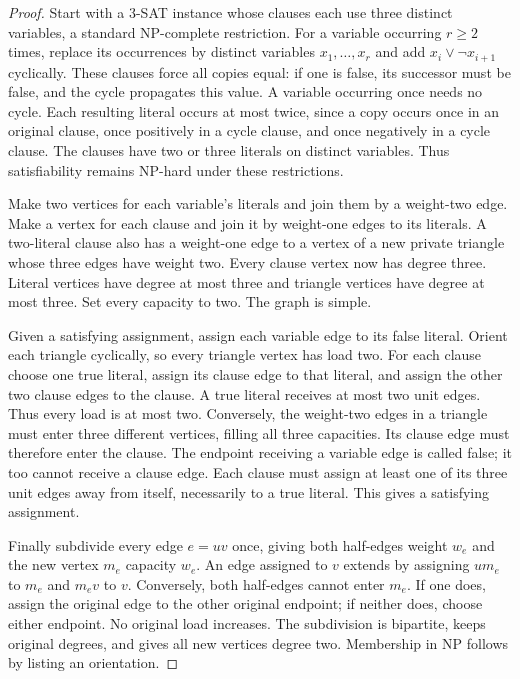 \begin{proof}
Start with a 3-SAT instance whose clauses each use three distinct
variables, a standard NP-complete restriction. For a variable occurring $r\ge2$ times,
replace its occurrences by distinct variables $x_1,\ldots,x_r$ and add
$x_i\vee\neg x_{i+1}$ cyclically. These clauses force all copies equal:
if one is false, its successor must be false, and the cycle propagates
this value. A variable occurring once needs no cycle. Each resulting
literal occurs at most twice, since a copy occurs once in an original
clause, once positively in a cycle clause, and once negatively in a cycle
clause. The clauses have two or three literals on distinct variables.
Thus satisfiability remains NP-hard under these restrictions.

Make two vertices for each variable's literals and join them by a
weight-two edge. Make a vertex for each clause and join it by weight-one
edges to its literals. A two-literal clause also has a weight-one edge to
a vertex of a new private triangle whose three edges have weight two.
Every clause vertex now has degree three. Literal vertices have degree at
most three and triangle vertices have degree at most three. Set every
capacity to two. The graph is simple.

Given a satisfying assignment, assign each variable edge to its false
literal. Orient each triangle cyclically, so every triangle vertex has
load two. For each clause choose one true literal, assign its clause edge
to that literal, and assign the other two clause edges to the clause.
A true literal receives at most two unit edges. Thus every load is at
most two. Conversely, the weight-two edges in a triangle must enter
three different vertices, filling all three capacities. Its clause edge
must therefore enter the clause. The endpoint receiving a variable edge
is called false; it too cannot receive a clause edge. Each clause must
assign at least one of its three unit edges away from itself, necessarily
to a true literal. This gives a satisfying assignment.

Finally subdivide every edge $e=uv$ once, giving both half-edges weight
$w_e$ and the new vertex $m_e$ capacity $w_e$. An edge assigned to $v$
extends by assigning $um_e$ to $m_e$ and $m_ev$ to $v$. Conversely, both
half-edges cannot enter $m_e$. If one does, assign the original edge to
the other original endpoint; if neither does, choose either endpoint.
No original load increases. The subdivision is bipartite, keeps original
degrees, and gives all new vertices degree two. Membership in NP follows
by listing an orientation.
\end{proof}

